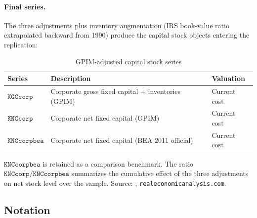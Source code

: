 \paragraph{Final series.}
The three adjustments plus inventory augmentation (IRS book-value ratio
extrapolated backward from 1990) produce the capital stock objects
entering the replication:

\begin{table}[!ht]
  \centering
  \small
  \caption{GPIM-adjusted capital stock series}
  \label{tab:app_gpim_series}
  \begin{tabular}{lll}
    \hline\hline
    Series & Description & Valuation \\
    \hline
    $\texttt{KGCcorp}$
      & Corporate gross fixed capital $+$ inventories (GPIM)
      & Current cost \\
    $\texttt{KNCcorp}$
      & Corporate net fixed capital (GPIM)
      & Current cost \\
    $\texttt{KNCcorpbea}$
      & Corporate net fixed capital (BEA 2011 official)
      & Current cost \\
    \hline
  \end{tabular}
  \par\vspace{0.4em}
  \footnotesize
  $\texttt{KNCcorpbea}$ is retained as a comparison benchmark.
  The ratio $\texttt{KNCcorp}/\texttt{KNCcorpbea}$ summarizes the
  cumulative effect of the three adjustments on net stock level over the
  sample. Source: \citet[Appendix~6.8]{Shaikh2016},
  \texttt{realeconomicanalysis.com}.
\end{table}


\subsection*{Notation}

